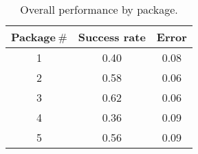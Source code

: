 \begin{table}[H]
\centering
\begin{tabular}{@{} *3c @{}}
\toprule
Package$~\#$ & Success rate & Error\\
\midrule
 1 & 0.40 & 0.08 \\ 
 2 & 0.58 & 0.06 \\
 3 & 0.62 & 0.06 \\
 4 & 0.36 & 0.09 \\
 5 & 0.56 & 0.09 \\
\bottomrule 
 \end{tabular}
 \caption{Overall performance by package.}
\label{table:measurement_by_package}
\end{table}

